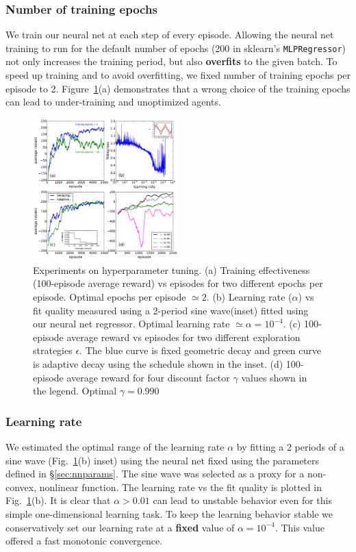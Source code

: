 \documentclass[conference]{IEEEtran}
\begin{document}
\subsubsection {Number of training epochs}
We train our neural net at each step of every episode. Allowing the neural net training to run for the default number of  epochs (200 in sklearn's {\tt MLPRegressor}) not only increases the training period, but also {\bf overfits} to the given batch. To speed up training and to avoid overfitting, we fixed number of training epochs per episode to 2. Figure~\ref{fig:lr}(a) demonstrates that a wrong choice of the training epochs can lead to under-training and unoptimized agents.
\begin{figure}[tbp]
    \centering
    \includegraphics[width=0.5\textwidth]{./figures/fig0.pdf}
    \caption{Experiments on hyperparameter tuning. (a) Training effectiveness (100-episode average reward) vs episodes for two different epochs per episode. Optimal epochs per episode $\simeq 2$. (b) Learning rate ($\alpha$) vs fit quality measured using a 2-period sine wave(inset) fitted using our neural net regressor. Optimal learning rate $\simeq \alpha=10^{-4}$. (c) 100-episode average reward vs episodes for two different exploration strategies $\epsilon$. The {\color{blue} blue} curve is fixed geometric decay and {\color{green} green} curve is adaptive decay using the schedule shown in the inset. (d) 100-episode average reward for four discount factor $\gamma$ values shown in the legend. Optimal $\gamma = 0.990$\label{fig:lr}}
\end{figure}
\subsubsection{Learning rate}
We estimated the optimal range of the learning rate $\alpha$ by fitting a 2 periods of a sine wave (Fig.~\ref{fig:lr}(b) inset) using the neural net fixed using the parameters defined in \S\ref{sec:nnparams}. The sine wave was selected as a proxy for a non-convex, nonlinear function. The learning rate vs the fit quality is plotted in Fig.~\ref{fig:lr}(b). It is clear that $\alpha>0.01$ can lead to unstable behavior even for this simple one-dimensional learning task. To keep the learning behavior stable we conservatively set our learning rate at a {\bf fixed } value of $\alpha = 10^{-4}$. This value offered a fast monotonic convergence.
\end{document}
